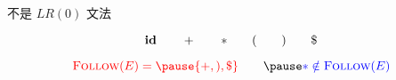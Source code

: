 






\begin{frame}
  \begin{columns}
      
  \end{columns}

  \begin{center}
    不是 $LR(0)$ 文法 \pause \qquad {}
  \end{center}
\end{frame}

\begin{frame}
  \[
    \id \qquad + \qquad \ast \qquad ( \qquad ) \qquad \$
  \]

  

  \pause
  \[
    \red{\follow(E) = \pause \set{+, ), \$}} \qquad \pause \blue{\ast \notin \follow(E)}
  \]
\end{frame}

